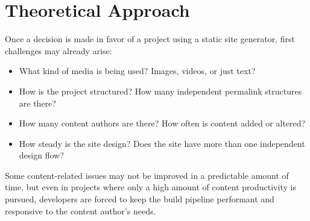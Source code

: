 \chapter{Theoretical Approach}
\label{cha:theoreticalapproach}

Once a decision is made in favor of a project using a static site generator, first challenges may already arise:

\begin{itemize}
  \item What kind of media is being used? Images, videos, or just text?
  \item How is the project structured? How many independent permalink structures are there?
  \item How many content authors are there? How often is content added or altered?
  \item How steady is the site design? Does the site have more than one independent design flow?
\end{itemize}
Some content-related issues may not be improved in a predictable amount of time, but even in projects where only a high amount of content productivity is pursued, developers are forced to keep the build pipeline performant and responsive to the content author's needs.




